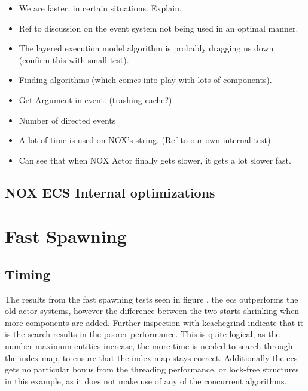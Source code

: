\begin{itemize}
    \item
    We are faster, in certain situations. Explain.

    \item
    Ref to discussion on the event system not being used in an optimal manner.

    \item
    The layered execution model algorithm is probably dragging us down (confirm this with small test).

    \item
    Finding algorithms (which comes into play with lots of components).

    \item
    Get Argument in event. (trashing cache?)

    \item
    Number of directed events

    \item
    A lot of time is used on NOX's string. (Ref to our own internal test).

    \item
    Can see that when NOX Actor finally gets slower, it gets a lot slower fast.
\end{itemize}


\subsection{NOX ECS Internal optimizations}

\section{Fast Spawning}
\subsection{Timing}
The results from the fast spawning tests seen in figure ,
the ecs outperforms the old actor systems, however the difference between the two
starts shrinking when more components are added.
Further inspection with kcachegrind indicate that it is the search results in the poorer performance.
This is quite logical, as the number maximum entities increase, the more time is needed
to search through the index map, to ensure that the index map stays correct.
Additionally the ecs gets no particular bonus from the threading performance, or lock-free structures
in this example, as it does not make use of any of the concurrent algorithms.

